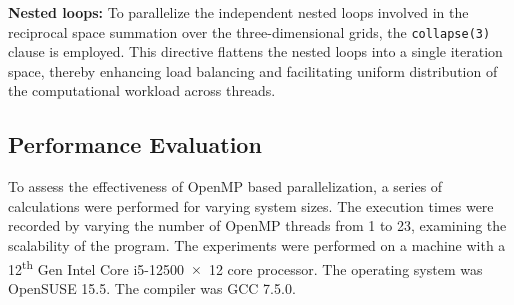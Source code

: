 \textbf{Nested loops:} To parallelize the independent nested loops involved in the reciprocal space summation over the three-dimensional grids, the \texttt{collapse(3)} clause is employed. This directive flattens the nested loops into a single iteration space, thereby enhancing load balancing and facilitating uniform distribution of the computational workload across threads.


\subsection{Performance Evaluation}
To assess the effectiveness of OpenMP based parallelization, a series of calculations were performed for varying system sizes. The execution times were recorded by varying the number of OpenMP threads from 1 to 23, examining the scalability of the program. The experiments were performed on a machine with a 12\textsuperscript{th} Gen Intel\textsuperscript{\textregistered} Core\texttrademark{} i5-12500~$\times$~12 core processor. The operating system was OpenSUSE 15.5. The compiler was GCC 7.5.0.


